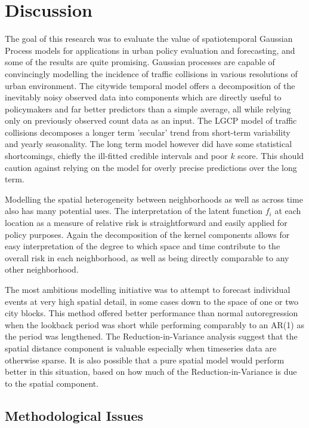 \chapter{Discussion}
\label{discussion}

The goal of this research was to evaluate the value of spatiotemporal Gaussian Process models for applications in urban policy evaluation and forecasting, and some of the results are quite promising. Gaussian processes are capable of convincingly modelling the incidence of traffic collisions in various resolutions of urban environment. The citywide temporal model offers a decomposition of the inevitably noisy observed data into components which are directly useful to policymakers and far better predictors than a simple average, all while relying only on previously observed count data as an input. The LGCP model of traffic collisions decomposes a longer term 'secular' trend from short-term variability and yearly seasonality. The long term model however did have some statistical shortcomings, chiefly the ill-fitted credible intervals and poor $k$ score. This should caution against relying on the model for overly precise predictions over the long term. \par

Modelling the spatial heterogeneity between neighborhoods as well as across time also has many potential uses. The interpretation of the latent function $f_i$ at each location as a measure of relative risk is straightforward and easily applied for policy purposes. Again the decomposition of the kernel components allows for easy interpretation of the degree to which space and time contribute to the overall risk in each neighborhood, as well as being directly comparable to any other neighborhood. \par

The most ambitious modelling initiative was to attempt to forecast individual events at very high spatial detail, in some cases down to the space of one or two city blocks. This method offered better performance than normal autoregression when the lookback period was short while performing comparably to an AR(1) as the period was lengthened. The Reduction-in-Variance analysis suggest that the spatial distance component is valuable especially when timeseries data are otherwise sparse. It is also possible that a pure spatial model would perform better in this situation, based on how much of the Reduction-in-Variance is due to the spatial component.

\section{Methodological Issues}

